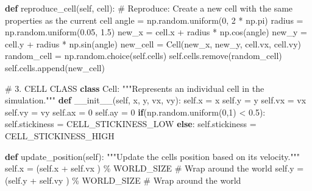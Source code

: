 \documentclass[
  letterpaper,
  DIV=11,
  numbers=noendperiod]{scrreprt}
\newenvironment{Shaded}{\begin{snugshade}}{\end{snugshade}}
\newcommand{\CommentTok}[1]{\textcolor[rgb]{0.37,0.37,0.37}{#1}}
\newcommand{\ControlFlowTok}[1]{\textcolor[rgb]{0.00,0.23,0.31}{\textbf{#1}}}
\newcommand{\DecValTok}[1]{\textcolor[rgb]{0.68,0.00,0.00}{#1}}
\newcommand{\FloatTok}[1]{\textcolor[rgb]{0.68,0.00,0.00}{#1}}
\newcommand{\FunctionTok}[1]{\textcolor[rgb]{0.28,0.35,0.67}{#1}}
\newcommand{\KeywordTok}[1]{\textcolor[rgb]{0.00,0.23,0.31}{\textbf{#1}}}
\newcommand{\NormalTok}[1]{\textcolor[rgb]{0.00,0.23,0.31}{#1}}
\newcommand{\OperatorTok}[1]{\textcolor[rgb]{0.37,0.37,0.37}{#1}}
\newcommand{\VariableTok}[1]{\textcolor[rgb]{0.07,0.07,0.07}{#1}}
\theoremstyle{definition}
\theoremstyle{remark}
\begin{document}
\begin{tcolorbox}
\begin{Shaded}
\begin{Highlighting}[]
    \KeywordTok{def}\NormalTok{ reproduce\_cell(}\VariableTok{self}\NormalTok{, cell):}
        \CommentTok{\# Reproduce: Create a new cell with the same properties as the current cell}
\NormalTok{        angle }\OperatorTok{=}\NormalTok{ np.random.uniform(}\DecValTok{0}\NormalTok{, }\DecValTok{2} \OperatorTok{*}\NormalTok{ np.pi)}
\NormalTok{        radius }\OperatorTok{=}\NormalTok{ np.random.uniform(}\FloatTok{0.05}\NormalTok{, }\FloatTok{1.5}\NormalTok{)}
\NormalTok{        new\_x }\OperatorTok{=}\NormalTok{ cell.x }\OperatorTok{+}\NormalTok{ radius }\OperatorTok{*}\NormalTok{ np.cos(angle)}
\NormalTok{        new\_y }\OperatorTok{=}\NormalTok{ cell.y }\OperatorTok{+}\NormalTok{ radius }\OperatorTok{*}\NormalTok{ np.sin(angle)}
\NormalTok{        new\_cell }\OperatorTok{=}\NormalTok{ Cell(new\_x, new\_y, cell.vx, cell.vy)}
\NormalTok{        random\_cell }\OperatorTok{=}\NormalTok{ np.random.choice(}\VariableTok{self}\NormalTok{.cells)   }
        \VariableTok{self}\NormalTok{.cells.remove(random\_cell)}
        \VariableTok{self}\NormalTok{.cells.append(new\_cell)}


        
        
        
\CommentTok{\# 3. CELL CLASS}
\KeywordTok{class}\NormalTok{ Cell:}
    \CommentTok{"""Represents an individual cell in the simulation."""}
    \KeywordTok{def} \FunctionTok{\_\_init\_\_}\NormalTok{(}\VariableTok{self}\NormalTok{, x, y, vx, vy):}
        \VariableTok{self}\NormalTok{.x }\OperatorTok{=}\NormalTok{ x}
        \VariableTok{self}\NormalTok{.y }\OperatorTok{=}\NormalTok{ y}
        \VariableTok{self}\NormalTok{.vx }\OperatorTok{=}\NormalTok{ vx}
        \VariableTok{self}\NormalTok{.vy }\OperatorTok{=}\NormalTok{ vy}
        \VariableTok{self}\NormalTok{.ax }\OperatorTok{=} \DecValTok{0}
        \VariableTok{self}\NormalTok{.ay }\OperatorTok{=} \DecValTok{0}
        \ControlFlowTok{if}\NormalTok{(np.random.uniform(}\DecValTok{0}\NormalTok{,}\DecValTok{1}\NormalTok{) }\OperatorTok{\textless{}} \FloatTok{0.5}\NormalTok{): }
            \VariableTok{self}\NormalTok{.stickiness }\OperatorTok{=}\NormalTok{ CELL\_STICKINESS\_LOW}
        \ControlFlowTok{else}\NormalTok{:}
            \VariableTok{self}\NormalTok{.stickiness }\OperatorTok{=}\NormalTok{ CELL\_STICKINESS\_HIGH}
        
    \KeywordTok{def}\NormalTok{ update\_position(}\VariableTok{self}\NormalTok{):}
        \CommentTok{"""Update the cell\textquotesingle{}s position based on its velocity."""}
        \VariableTok{self}\NormalTok{.x }\OperatorTok{=}\NormalTok{ (}\VariableTok{self}\NormalTok{.x }\OperatorTok{+} \VariableTok{self}\NormalTok{.vx ) }\OperatorTok{\%}\NormalTok{ WORLD\_SIZE  }\CommentTok{\# Wrap around the world}
        \VariableTok{self}\NormalTok{.y }\OperatorTok{=}\NormalTok{ (}\VariableTok{self}\NormalTok{.y }\OperatorTok{+} \VariableTok{self}\NormalTok{.vy ) }\OperatorTok{\%}\NormalTok{ WORLD\_SIZE  }\CommentTok{\# Wrap around the world}


\end{Highlighting}
\end{Shaded}
\end{tcolorbox}
\end{document}
